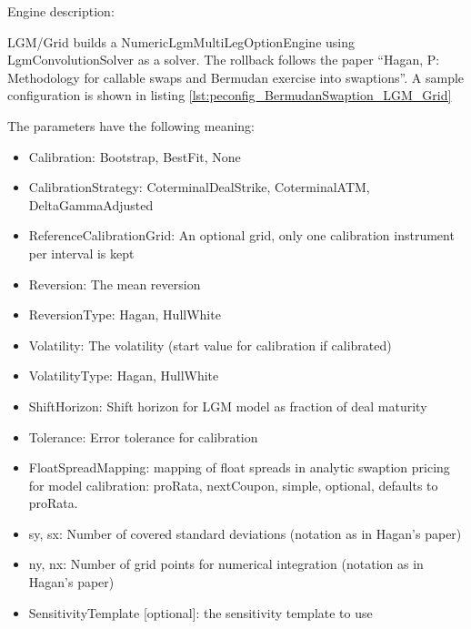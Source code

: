 Engine description:

LGM/Grid builds a NumericLgmMultiLegOptionEngine using LgmConvolutionSolver as a solver. The rollback follows the paper
``Hagan, P: Methodology for callable swaps and Bermudan exercise into swaptions''. A sample configuration is shown in
listing \ref{lst:peconfig_BermudanSwaption_LGM_Grid}

The parameters have the following meaning:

\begin{itemize}
\item Calibration: Bootstrap, BestFit, None
\item CalibrationStrategy: CoterminalDealStrike, CoterminalATM, DeltaGammaAdjusted
\item ReferenceCalibrationGrid: An optional grid, only one calibration instrument per interval is kept
\item Reversion: The mean reversion
\item ReversionType: Hagan, HullWhite
\item Volatility: The volatility (start value for calibration if calibrated)
\item VolatilityType: Hagan, HullWhite
\item ShiftHorizon: Shift horizon for LGM model as fraction of deal maturity
\item Tolerance: Error tolerance for calibration
\item FloatSpreadMapping: mapping of float spreads in analytic swaption pricing for model calibration: proRata,
  nextCoupon, simple, optional, defaults to proRata.
\item sy, sx: Number of covered standard deviations (notation as in Hagan's paper)
\item ny, nx: Number of grid points for numerical integration (notation as in Hagan's paper)
\item SensitivityTemplate [optional]: the sensitivity template to use
\end{itemize}

